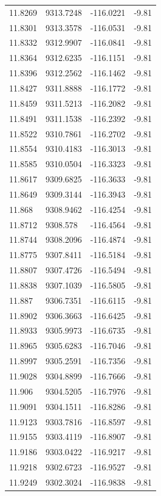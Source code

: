 \begin{table}[H]
\begin{tabular}{llll}
11.8269 & 9313.7248 & -116.0221 & -9.81 \\
11.8301 & 9313.3578 & -116.0531 & -9.81 \\
11.8332 & 9312.9907 & -116.0841 & -9.81 \\
11.8364 & 9312.6235 & -116.1151 & -9.81 \\
11.8396 & 9312.2562 & -116.1462 & -9.81 \\
11.8427 & 9311.8888 & -116.1772 & -9.81 \\
11.8459 & 9311.5213 & -116.2082 & -9.81 \\
11.8491 & 9311.1538 & -116.2392 & -9.81 \\
11.8522 & 9310.7861 & -116.2702 & -9.81 \\
11.8554 & 9310.4183 & -116.3013 & -9.81 \\
11.8585 & 9310.0504 & -116.3323 & -9.81 \\
11.8617 & 9309.6825 & -116.3633 & -9.81 \\
11.8649 & 9309.3144 & -116.3943 & -9.81 \\
11.868 & 9308.9462 & -116.4254 & -9.81 \\
11.8712 & 9308.578 & -116.4564 & -9.81 \\
11.8744 & 9308.2096 & -116.4874 & -9.81 \\
11.8775 & 9307.8411 & -116.5184 & -9.81 \\
11.8807 & 9307.4726 & -116.5494 & -9.81 \\
11.8838 & 9307.1039 & -116.5805 & -9.81 \\
11.887 & 9306.7351 & -116.6115 & -9.81 \\
11.8902 & 9306.3663 & -116.6425 & -9.81 \\
11.8933 & 9305.9973 & -116.6735 & -9.81 \\
11.8965 & 9305.6283 & -116.7046 & -9.81 \\
11.8997 & 9305.2591 & -116.7356 & -9.81 \\
11.9028 & 9304.8899 & -116.7666 & -9.81 \\
11.906 & 9304.5205 & -116.7976 & -9.81 \\
11.9091 & 9304.1511 & -116.8286 & -9.81 \\
11.9123 & 9303.7816 & -116.8597 & -9.81 \\
11.9155 & 9303.4119 & -116.8907 & -9.81 \\
11.9186 & 9303.0422 & -116.9217 & -9.81 \\
11.9218 & 9302.6723 & -116.9527 & -9.81 \\
11.9249 & 9302.3024 & -116.9838 & -9.81 \\

\end{tabular}
\end{table}
